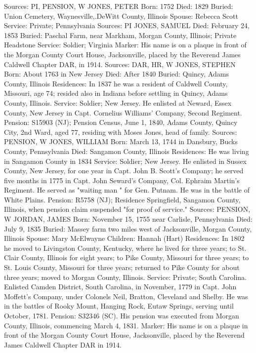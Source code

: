 Sources: PI, PENSION, W 
JONES, PETER 
Born: 1752
Died: 1829 
Buried: Union Cemetery, Waynesville,.DeWitt County, Illinois 
Spouse: Rebecca Scott
Service: Private; Pennsylvania 
Sources: PI 
JONES, SAMUEL
Died: February 24, 1853 
Buried: Paschal Farm, near Markham, Morgan County, Illinois; Private Headstone
Service: Soldier; Virginia
Marker: His name is on a plaque in front of the Morgan County Court House, Jacksonville, placed by the Reverend James Caldwell Chapter DAR, in 1914. 
Sources: DAR, HR, W 
JONES, STEPHEN
Born: About 1763 in New Jersey
Died: After 1840 
Buried: Quincy, Adams County, Illinois 
Residences: In 1837 he was a resident of Caldwell County, Missouri, age 74; resided also in Indiana before settling in Quincy, Adams County, Illinois.
Service: Soldier; New Jersey. He enlisted at Neward, Essex County, New Jersey in Capt. Cornelius Williams' Company, Second Regiment.
Pension: S15903 (NJ); Pension Census, June 1, 1840, Adams County, Quincy City, 2nd Ward, aged 77, residing with Moses Jones, head of family. 
Sources: PENSION, W 
JONES, WILLIAM
Born: March 13, 1744 in Dansbury, Bucks County, Pennsylvania
Died: Sangamon County, Illinois 
Residences: He was living in Sangamon County in 1834
Service: Soldier; New Jersey. He enlisted in Sussex County, New Jersey, for one year in Capt. John B. Scott's Company; he served five months in 1775 in 
Capt. John Seward's Company, Col. Ephraim Martin's Regiment. He served as "waiting man " for Gen. Putnam. He was in the battle of White Plains.
Pension: R5758 (NJ); Residence Springfield, Sangamon County, Illinois, when pension claim suspended "for proof of service." 
Sources: PENSION, W 
JORDAN, JAMES 
Born: November 15, 1755 near Carlisle, Pennsylvania
Died: July 9, 1835 
Buried: Massey farm two miles west of Jacksonville, Morgan County, Illinois 
Spouse: Mary McElwayne 
Children: Hannah (Hart) 
Residences: In 1802 he moved to Livingston County, Kentucky, where he lived for three years; to St. Clair County, Illinois for eight years; to Pike County, Missouri for three years; to St. Louis County, Missouri for three years; returned to Pike County for about three years; moved to Morgan County, Illinois. 
Service: Private; South Carolina. Enlisted Camden District, South Carolina, in November, 1779 in Capt. John Moffett's Company, under Colonels Neil, Bratton, Cleveland and Shelby. He was in the battles of Rooky Mount, Hanging Rock, Eutaw Springs, serving until October, 1781. 
Pension: S32346 (SC). His pension was executed from Morgan County, Illinois, commencing March 4, 1831.
Marker: His name is on a plaque in front of the Morgan County Court House, Jacksonville, placed by the Reverend James Caldwell Chapter DAR in 1914. 
